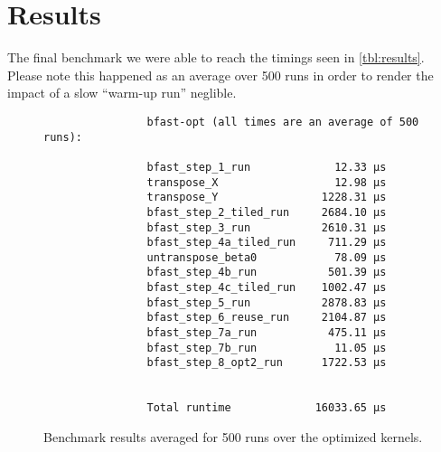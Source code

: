 \section{Results}

The final benchmark we were able to reach the timings seen in \autoref{tbl:results}.
Please note this happened as an average over 500 runs in order to render the
impact of a slow \enquote{warm-up run} neglible.

\begin{figure}[H]
\centering
                \begin{verbatim}
                bfast-opt (all times are an average of 500 runs):

                bfast_step_1_run             12.33 µs
                transpose_X                  12.98 µs
                transpose_Y                1228.31 µs
                bfast_step_2_tiled_run     2684.10 µs
                bfast_step_3_run           2610.31 µs
                bfast_step_4a_tiled_run     711.29 µs
                untranspose_beta0            78.09 µs
                bfast_step_4b_run           501.39 µs
                bfast_step_4c_tiled_run    1002.47 µs
                bfast_step_5_run           2878.83 µs
                bfast_step_6_reuse_run     2104.87 µs
                bfast_step_7a_run           475.11 µs
                bfast_step_7b_run            11.05 µs
                bfast_step_8_opt2_run      1722.53 µs


                Total runtime             16033.65 µs

                \end{verbatim}
\caption{Benchmark results averaged for 500 runs over the optimized kernels.}
\label{tbl:results}
\end{figure}
